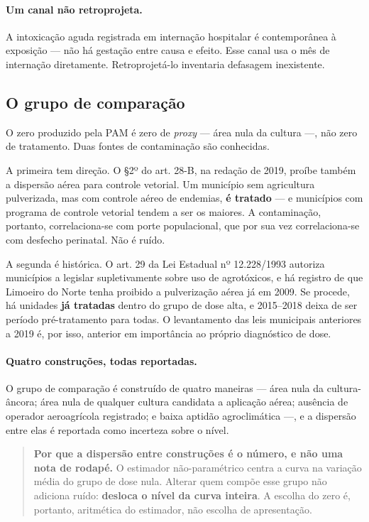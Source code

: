\paragraph{Um canal não retroprojeta.} A intoxicação aguda registrada em
internação hospitalar é contemporânea à exposição --- não há gestação entre causa
e efeito. Esse canal usa o mês de internação diretamente. Retroprojetá-lo
inventaria defasagem inexistente.

\subsection{O grupo de comparação}
\label{sub:zero}

O zero produzido pela PAM é zero de \emph{proxy} --- área nula da cultura ---, não
zero de tratamento. Duas fontes de contaminação são conhecidas.

A primeira tem direção. O §2º do art. 28-B, na redação de 2019, proíbe também a
dispersão aérea para controle vetorial. Um município sem agricultura pulverizada,
mas com controle aéreo de endemias, \textbf{é tratado} --- e municípios com
programa de controle vetorial tendem a ser os maiores. A contaminação, portanto,
correlaciona-se com porte populacional, que por sua vez correlaciona-se com
desfecho perinatal. Não é ruído.

A segunda é histórica. O art. 29 da Lei Estadual nº 12.228/1993 autoriza
municípios a legislar supletivamente sobre uso de agrotóxicos, e há registro de
que Limoeiro do Norte tenha proibido a pulverização aérea já em 2009. Se procede,
há unidades \textbf{já tratadas} dentro do grupo de dose alta, e 2015--2018 deixa
de ser período pré-tratamento para todas. O levantamento das leis municipais
anteriores a 2019 é, por isso, anterior em importância ao próprio diagnóstico de
dose.

\paragraph{Quatro construções, todas reportadas.} O grupo de comparação é
construído de quatro maneiras --- área nula da cultura-âncora; área nula de
qualquer cultura candidata a aplicação aérea; ausência de operador aeroagrícola
registrado; e baixa aptidão agroclimática ---, e a dispersão entre elas é
reportada como incerteza sobre o nível.

\begin{quote}
\textbf{Por que a dispersão entre construções é o número, e não uma nota de
rodapé.} O estimador não-paramétrico centra a curva na variação média do grupo de
dose nula. Alterar quem compõe esse grupo não adiciona ruído: \textbf{desloca o
nível da curva inteira}. A escolha do zero é, portanto, aritmética do estimador,
não escolha de apresentação.
\end{quote}

